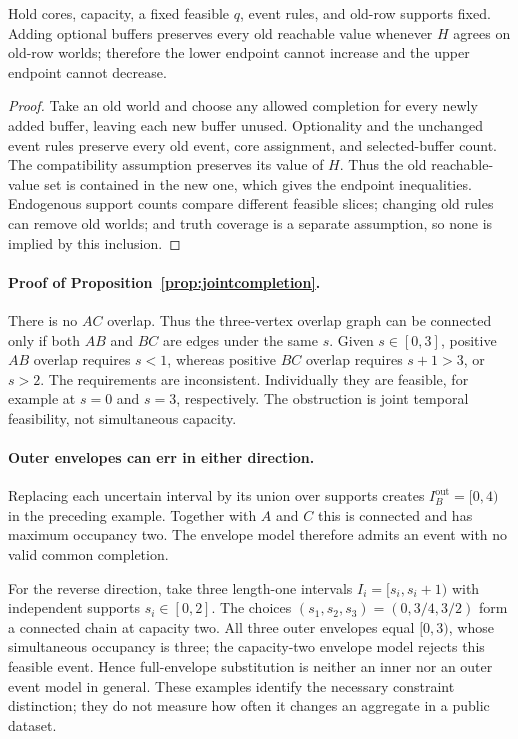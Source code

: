 \begin{proposition}
\label{prop:candidatesupport}
Hold cores, capacity, a fixed feasible $q$, event rules, and old-row supports
fixed. Adding optional buffers preserves every old reachable value whenever
$H$ agrees on old-row worlds; therefore the lower endpoint cannot increase
and the upper endpoint cannot decrease.
\end{proposition}
\begin{proof}
Take an old world and choose any allowed completion for every newly added
buffer, leaving each new buffer unused. Optionality and the unchanged event
rules preserve every old event, core assignment, and selected-buffer count.
The compatibility assumption preserves its value of $H$. Thus the old
reachable-value set is contained in the new one, which gives the endpoint
inequalities. Endogenous support counts compare different feasible slices;
changing old rules can remove old worlds; and truth coverage is a separate
assumption, so none is implied by this inclusion.
\end{proof}

\paragraph{Proof of Proposition~\ref{prop:jointcompletion}.}
There is no $AC$ overlap. Thus the three-vertex overlap graph can be connected
only if both $AB$ and $BC$ are edges under the same $s$.
Given $s\in[0,3]$, positive $AB$ overlap requires $s<1$, whereas positive $BC$
overlap requires $s+1>3$, or $s>2$. The requirements are inconsistent.
Individually they are feasible, for example at $s=0$ and $s=3$, respectively.
The obstruction is joint temporal feasibility, not simultaneous capacity.

\paragraph{Outer envelopes can err in either direction.}
Replacing each uncertain interval by its union over supports creates
$I_B^{\mathrm{out}}=[0,4)$ in the preceding example. Together with $A$ and $C$
this is connected and has maximum occupancy two. The envelope model therefore
admits an event with no valid common completion.

For the reverse direction, take three length-one intervals
$I_i=[s_i,s_i+1)$ with independent supports $s_i\in[0,2]$.
The choices $(s_1,s_2,s_3)=(0,3/4,3/2)$ form a connected chain at capacity
two. All three outer envelopes equal $[0,3)$, whose simultaneous occupancy is
three; the capacity-two envelope model rejects this feasible event. Hence
full-envelope substitution is neither an inner nor an outer event model in
general. These examples identify the necessary constraint distinction; they
do not measure how often it changes an aggregate in a public dataset.

